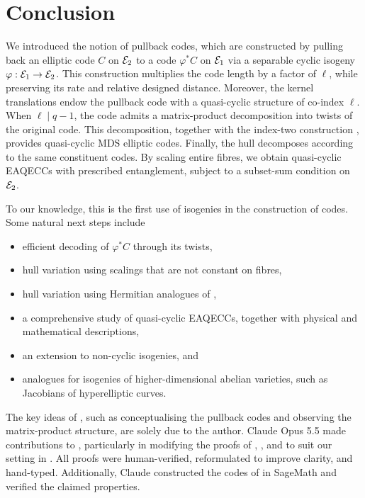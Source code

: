 \documentclass[twocolumn, 11pt]{scrartcl}
\begin{document}
\section{Conclusion} \label{section:conclusion}

We introduced the notion of pullback codes, which are constructed by pulling back an elliptic code $C$ on $\mathcal{E}_2$ to a code $\varphi^*C$ on $\mathcal{E}_1$ via a separable cyclic isogeny $\varphi:\mathcal{E}_1\to \mathcal{E}_2$. This construction multiplies the code length by a factor of $\ell$, while preserving its rate and relative designed distance. Moreover, the kernel translations endow the pullback code with a quasi-cyclic structure of co-index $\ell$. When $\ell\mid q-1$, the code admits a matrix-product decomposition into twists of the original code. This decomposition, together with the index-two construction \cite{wang2025nonrs}, provides quasi-cyclic MDS elliptic codes. Finally, the hull decomposes according to the same constituent codes. By scaling entire fibres, we obtain quasi-cyclic EAQECCs with prescribed entanglement, subject to a subset-sum condition on $\mathcal{E}_2$.

To our knowledge, this is the first use of isogenies in the construction of codes. Some natural next steps include
\begin{itemize}
    \item efficient decoding of $\varphi^*C$ through its twists,
    \item hull variation using scalings that are not constant on fibres,
    \item hull variation using Hermitian analogues of ,
    \item a comprehensive study of quasi-cyclic EAQECCs, together with physical and mathematical descriptions,
    \item an extension to non-cyclic isogenies, and
    \item analogues for isogenies of higher-dimensional abelian varieties, such as Jacobians of hyperelliptic curves.
\end{itemize}

\printbibliography


The key ideas of , such as conceptualising the pullback codes and observing the matrix-product structure, are solely due to the author. Claude Opus 5.5 made contributions to , particularly in modifying the proofs of \cite[Prop.~4.1, Thm.~4.2]{ling2001algebraic}, \cite[Lem.~3--4]{wang2026generic}, and \cite[Thm.~1(i)]{fang2020euclidean} to suit our setting in . All proofs were human-verified, reformulated to improve clarity, and hand-typed. Additionally, Claude constructed the codes of  in SageMath \cite{code-f256,code-f64} and verified the claimed properties.
\end{document}

